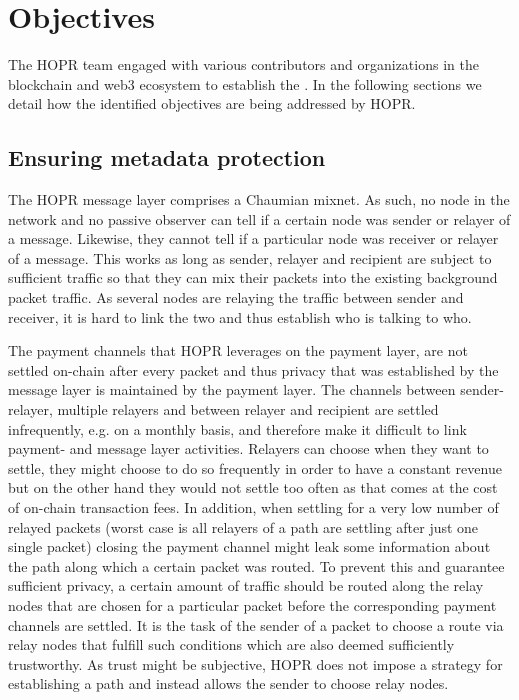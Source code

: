 \section{Objectives}
The HOPR team engaged with various contributors and organizations in the blockchain and web3 ecosystem to establish the . In the following sections we detail how the identified objectives are being addressed by HOPR.

\subsection{Ensuring metadata protection}
The HOPR message layer comprises a Chaumian mixnet. As such, no node in the network and no passive observer can tell if a certain node was sender or relayer of a message. Likewise, they cannot tell if a particular node was receiver or relayer of a message. This works as long as sender, relayer and recipient are subject to sufficient traffic so that they can mix their packets into the existing background packet traffic. As several nodes are relaying the traffic between sender and receiver, it is hard to link the two and thus establish who is talking to who.

The payment channels that HOPR leverages on the payment layer, are not settled on-chain after every packet and thus privacy that was established by the message layer is maintained by the payment layer. The channels between sender-relayer, multiple relayers and between relayer and recipient are settled infrequently, e.g. on a monthly basis, and therefore make it difficult to link payment- and message layer activities. Relayers can choose when they want to settle, they might choose to do so frequently in order to have a constant revenue but on the other hand they would not settle too often as that comes at the cost of on-chain transaction fees. In addition, when settling for a very low number of relayed packets (worst case is all relayers of a path are settling after just one single packet) closing the payment channel might leak some information about the path along which a certain packet was routed. To prevent this and guarantee sufficient privacy, a certain amount of traffic should be routed along the relay nodes that are chosen for a particular packet before the corresponding payment channels are settled. It is the task of the sender of a packet to choose a route via relay nodes that fulfill such conditions which are also deemed sufficiently trustworthy. As trust might be subjective, HOPR does not impose a strategy for establishing a path and instead allows the sender to choose relay nodes.

